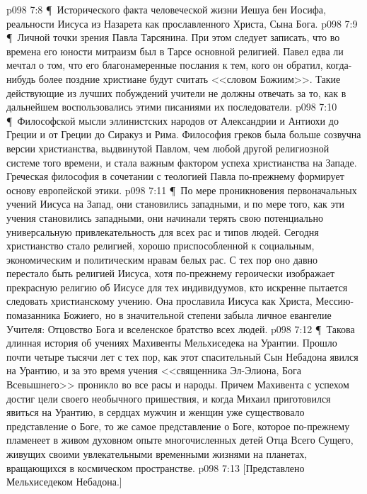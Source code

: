 \vs p098 7:8 \P\ \bibnobreakspace Исторического факта человеческой жизни Иешуа бен Иосифа, реальности Иисуса из Назарета как прославленного Христа, Сына Бога.
\vs p098 7:9 \P\ \bibnobreakspace Личной точки зрения Павла Тарсянина. При этом следует записать, что во времена его юности митраизм был в Тарсе основной религией. Павел едва ли мечтал о том, что его благонамеренные послания к тем, кого он обратил, когда\hyp{}нибудь более поздние христиане будут считать <<словом Божиим>>. Такие действующие из лучших побуждений учители не должны отвечать за то, как в дальнейшем воспользовались этими писаниями их последователи.
\vs p098 7:10 \P\ \bibnobreakspace Философской мысли эллинистских народов от Александрии и Антиохи до Греции и от Греции до Сиракуз и Рима. Философия греков была больше созвучна версии христианства, выдвинутой Павлом, чем любой другой религиозной системе того времени, и стала важным фактором успеха христианства на Западе. Греческая философия в сочетании с теологией Павла по\hyp{}прежнему формирует основу европейской этики.
\vs p098 7:11 \P\ По мере проникновения первоначальных учений Иисуса на Запад, они становились западными, и по мере того, как эти учения становились западными, они начинали терять свою потенциально универсальную привлекательность для всех рас и типов людей. Сегодня христианство стало религией, хорошо приспособленной к социальным, экономическим и политическим нравам белых рас. С тех пор оно давно перестало быть религией Иисуса, хотя по\hyp{}прежнему героически изображает прекрасную религию об Иисусе для тех индивидуумов, кто искренне пытается следовать христианскому учению. Она прославила Иисуса как Христа, Мессию\hyp{}помазанника Божиего, но в значительной степени забыла личное евангелие Учителя: Отцовство Бога и вселенское братство всех людей.
\vs p098 7:12 \P\ Такова длинная история об учениях Махивенты Мельхиседека на Урантии. Прошло почти четыре тысячи лет с тех пор, как этот спасительный Сын Небадона явился на Урантию, и за это время учения <<священника Эл\hyp{}Элиона, Бога Всевышнего>> проникло во все расы и народы. Причем Махивента с успехом достиг цели своего необычного пришествия, и когда Михаил приготовился явиться на Урантию, в сердцах мужчин и женщин уже существовало представление о Боге, то же самое представление о Боге, которое по\hyp{}прежнему пламенеет в живом духовном опыте многочисленных детей Отца Всего Сущего, живущих своими увлекательными временными жизнями на планетах, вращающихся в космическом пространстве.
\vs p098 7:13 [Представлено Мельхиседеком Небадона.]

